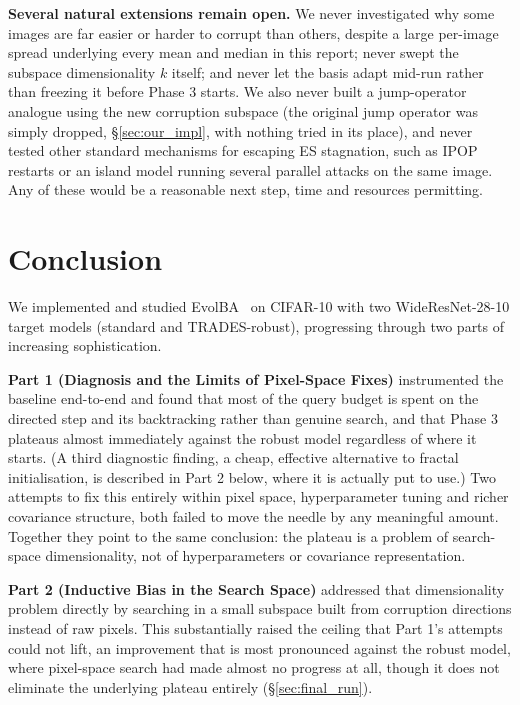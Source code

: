 \documentclass[11pt, a4paper]{article}
\begin{document}
\textbf{Several natural extensions remain open.} We never investigated why some images are far easier or harder to corrupt than others, despite a large per-image spread underlying every mean and median in this report; never swept the subspace dimensionality $k$ itself; and never let the basis adapt mid-run rather than freezing it before Phase 3 starts. We also never built a jump-operator analogue using the new corruption subspace (the original jump operator was simply dropped, \S\ref{sec:our_impl}, with nothing tried in its place), and never tested other standard mechanisms for escaping ES stagnation, such as IPOP restarts or an island model running several parallel attacks on the same image. Any of these would be a reasonable next step, time and resources permitting.

\section{Conclusion}

We implemented and studied EvolBA~\cite{evolba2024} on CIFAR-10 with two WideResNet-28-10 target models (standard and TRADES-robust), progressing through two parts of increasing sophistication.

\textbf{Part 1 (Diagnosis and the Limits of Pixel-Space Fixes)} instrumented the baseline end-to-end and found that most of the query budget is spent on the directed step and its backtracking rather than genuine search, and that Phase 3 plateaus almost immediately against the robust model regardless of where it starts. (A third diagnostic finding, a cheap, effective alternative to fractal initialisation, is described in Part 2 below, where it is actually put to use.) Two attempts to fix this entirely within pixel space, hyperparameter tuning and richer covariance structure, both failed to move the needle by any meaningful amount. Together they point to the same conclusion: the plateau is a problem of search-space dimensionality, not of hyperparameters or covariance representation.

\textbf{Part 2 (Inductive Bias in the Search Space)} addressed that dimensionality problem directly by searching in a small subspace built from corruption directions instead of raw pixels. This substantially raised the ceiling that Part 1's attempts could not lift, an improvement that is most pronounced against the robust model, where pixel-space search had made almost no progress at all, though it does not eliminate the underlying plateau entirely (\S\ref{sec:final_run}).
\end{document}
